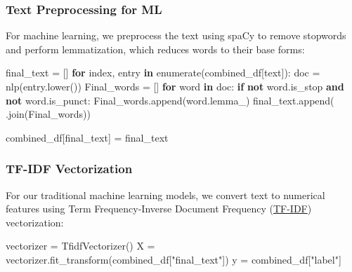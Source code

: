 \documentclass[
]{article}
\newenvironment{Shaded}{}{}
\newcommand{\BuiltInTok}[1]{\textcolor[rgb]{0.00,0.50,0.00}{#1}}
\newcommand{\ControlFlowTok}[1]{\textcolor[rgb]{0.00,0.44,0.13}{\textbf{#1}}}
\newcommand{\KeywordTok}[1]{\textcolor[rgb]{0.00,0.44,0.13}{\textbf{#1}}}
\newcommand{\NormalTok}[1]{#1}
\newcommand{\OperatorTok}[1]{\textcolor[rgb]{0.40,0.40,0.40}{#1}}
\newcommand{\StringTok}[1]{\textcolor[rgb]{0.25,0.44,0.63}{#1}}
\begin{document}
\subsubsection{Text Preprocessing for
ML}\label{text-preprocessing-for-ml}

For machine learning, we preprocess the text using spaCy to remove
stopwords and perform lemmatization, which reduces words to their base
forms:

\begin{Shaded}
\begin{Highlighting}[]
\NormalTok{final\_text }\OperatorTok{=}\NormalTok{ []}
\ControlFlowTok{for}\NormalTok{ index, entry }\KeywordTok{in} \BuiltInTok{enumerate}\NormalTok{(combined\_df[}\StringTok{\textquotesingle{}text\textquotesingle{}}\NormalTok{]):}
\NormalTok{    doc }\OperatorTok{=}\NormalTok{ nlp(entry.lower())}
\NormalTok{    Final\_words }\OperatorTok{=}\NormalTok{ []}
    \ControlFlowTok{for}\NormalTok{ word }\KeywordTok{in}\NormalTok{ doc:}
        \ControlFlowTok{if} \KeywordTok{not}\NormalTok{ word.is\_stop }\KeywordTok{and} \KeywordTok{not}\NormalTok{ word.is\_punct:}
\NormalTok{            Final\_words.append(word.lemma\_)}
\NormalTok{    final\_text.append(}\StringTok{\textquotesingle{} \textquotesingle{}}\NormalTok{.join(Final\_words))}

\NormalTok{combined\_df[}\StringTok{\textquotesingle{}final\_text\textquotesingle{}}\NormalTok{] }\OperatorTok{=}\NormalTok{ final\_text}
\end{Highlighting}
\end{Shaded}

\subsubsection{TF-IDF Vectorization}\label{tf-idf-vectorization}

For our traditional machine learning models, we convert text to
numerical features using Term Frequency-Inverse Document Frequency
(\href{https://en.wikipedia.org/wiki/Tf–idf}{TF-IDF}) vectorization:

\begin{Shaded}
\begin{Highlighting}[]
\NormalTok{vectorizer }\OperatorTok{=}\NormalTok{ TfidfVectorizer()}
\NormalTok{X }\OperatorTok{=}\NormalTok{ vectorizer.fit\_transform(combined\_df[}\StringTok{"final\_text"}\NormalTok{])}
\NormalTok{y }\OperatorTok{=}\NormalTok{ combined\_df[}\StringTok{"label"}\NormalTok{]}
\end{Highlighting}
\end{Shaded}
\end{document}

